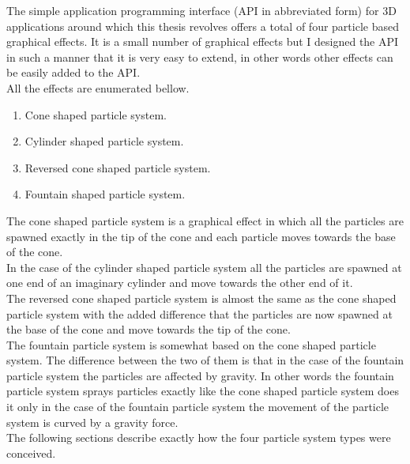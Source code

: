 The simple application programming interface (API in abbreviated form) for 3D applications around which this thesis revolves offers a total of four particle based graphical effects. It is a small number of graphical effects but I designed the API in such a manner that it is very easy to extend, in other words other effects can be easily added to the API.\\

All the effects are enumerated bellow.

\begin{enumerate}
	\item Cone shaped particle system.
	
	\item Cylinder shaped particle system.
	
	\item Reversed cone shaped particle system.
	
	\item Fountain shaped particle system.
\end{enumerate}

The cone shaped particle system is a graphical effect in which all the particles are spawned exactly in the tip of the cone and each particle moves towards the base of the cone.\\

In the case of the cylinder shaped particle system all the particles are spawned at one end of an imaginary cylinder and move towards the other end of it.\\

The reversed cone shaped particle system is almost the same as the cone shaped particle system with the added difference that the particles are now spawned at the base of the cone and move towards the tip of the cone.\\

\newpage
The fountain particle system is somewhat based on the cone shaped particle system. The difference between the two of them is that in the case of the fountain particle system the particles are affected by gravity. In other words the fountain particle system sprays particles exactly like the cone shaped particle system does it only in the case of the fountain particle system the movement of the particle system is curved by a gravity force.\\

The following sections describe exactly how the four particle system types were conceived.\\

